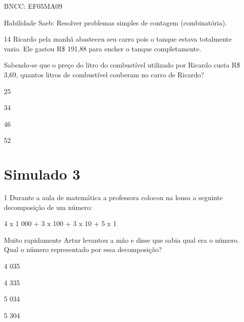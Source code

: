 {{BNCC: EF05MA09

Habilidade Saeb: Resolver problemas simples de contagem (combinatória).}

\num{14} Ricardo pela manhã abasteceu seu carro pois o tanque estava
totalmente vazio. Ele gastou R\$ 191,88 para encher o tanque
completamente.

Sabendo-se que o preço do litro do combustível utilizado por Ricardo
custa R\$ 3,69, quantos litros de combustível couberam no carro de
Ricardo?

\begin{escolha}
\item
  25
\item
  34
\item
  46
\item
  52
\end{escolha}


\chapter{Simulado 3}

\num{1} Durante a aula de matemática a professora colocou na lousa a
seguinte decomposição de um número:

4 x 1 000 + 3 x 100 + 3 x 10 + 5 x 1

Muito rapidamente Artur levantou a mão e disse que sabia qual era o
número. Qual o número representado por essa decomposição?

\begin{escolha}
\item
  4 035
\item
  4 335
\item
  5 034
\item
  5 304
\end{escolha}

}
